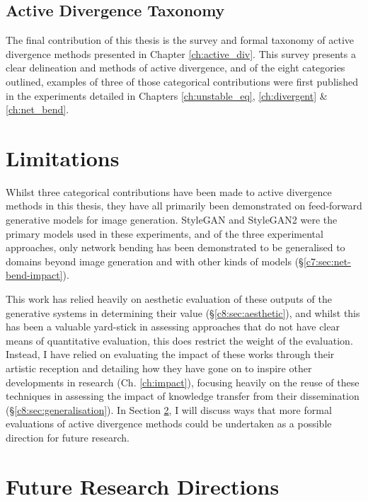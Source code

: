 \subsection{Active Divergence Taxonomy}

The final contribution of this thesis is the survey and formal taxonomy of active divergence methods presented in Chapter \ref{ch:active_div}.
This survey presents a clear delineation and methods of active divergence, and of the eight categories outlined, examples of three of those categorical contributions were first published in the experiments detailed in Chapters \ref{ch:unstable_eq}, \ref{ch:divergent} \& \ref{ch:net_bend}.

\section{Limitations}
\label{c9:sec:limitations}

Whilst three categorical contributions have been made to active divergence methods in this thesis, they have all primarily been demonstrated on feed-forward generative models for image generation.
StyleGAN \citep{karras2019style} and StyleGAN2 \citep{karras2019analyzing} were the primary models used in these experiments, and of the three experimental approaches, only network bending has been demonstrated to be generalised to domains beyond image generation and with other kinds of models (\S \ref{c7:sec:net-bend-impact}).

This work has relied heavily on aesthetic evaluation of these outputs of the generative systems in determining their value (\S \ref{c8:sec:aesthetic}), and whilst this has been a valuable yard-stick in assessing approaches that do not have clear means of quantitative evaluation, this does restrict the weight of the evaluation.
Instead, I have relied on evaluating the impact of these works through their artistic reception and detailing how they have gone on to inspire other developments in research (Ch. \ref{ch:impact}), focusing heavily on the reuse of these techniques in assessing the impact of knowledge transfer from their dissemination (\S \ref{c8:sec:generalisation}).
In Section \ref{c9:sec:future}, I will discuss ways that more formal evaluations of active divergence methods could be undertaken as a possible direction for future research.

\section{Future Research Directions}
\label{c9:sec:future}

